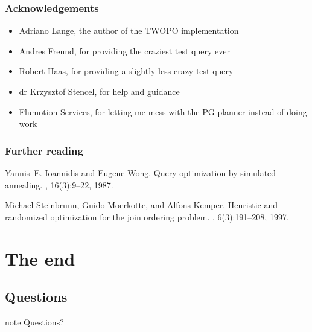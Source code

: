 \documentclass{beamer}
\begin{document}
\begin{frame}
  \frametitle{Acknowledgements}

  \begin{itemize}
  \item Adriano Lange, the author of the TWOPO implementation
  \item Andres Freund, for providing the craziest test query ever
  \item Robert Haas, for providing a slightly less crazy test query
  \item dr Krzysztof Stencel, for help and guidance
  \item Flumotion Services, for letting me mess with the PG planner instead of
    doing work
  \end{itemize}
\end{frame}

\begin{frame}
  \frametitle{Further reading}

  \begin{thebibliography}{Steinbrunn 1997}

    Yannis~E. Ioannidis and Eugene Wong.
    \newblock Query optimization by simulated annealing.
    , 16(3):9--22, 1987.

    Michael Steinbrunn, Guido Moerkotte, and Alfons Kemper.
    \newblock Heuristic and randomized optimization for the join ordering problem.
    , 6(3):191--208, 1997.

  \end{thebibliography}
\end{frame}

\section{The end}
\subsection*{Questions}

\begin{frame}
\begin{beamercolorbox}[center]{note}
  \Huge Questions?
\end{beamercolorbox}
\end{frame}

\appendix

\end{document}
